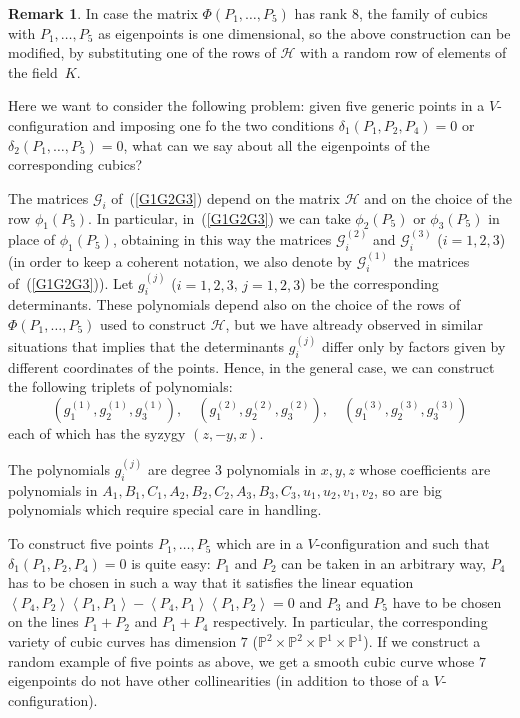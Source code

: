 \documentclass[11pt, a4paper, reqno, captions=tableheading,bibliography=totoc]{scrartcl}
\theoremstyle{plain}
\theoremstyle{definition}
\newtheorem{rmk}[lemma]{Remark}
\newcommand{\scl}[2]{\left\langle {#1}, {#2} \right\rangle}
\begin{document}
\begin{rmk}
In case the matrix $\Phi(P_1, \dots, P_5)$ has rank $8$, the family of
cubics with $P_1, \dots, P_5$ as eigenpoints is one dimensional, so the
above construction can be modified, by substituting one of the rows of
$\mathcal{H}$ with a random row of elements of the field~$K$.
\end{rmk}

Here we want to consider the following problem:
given five generic points in a $V$-configuration and imposing one
fo the two conditions
$\delta_1(P_1, P_2, P_4) = 0$ or $\delta_2(P_1, \dots, P_5) = 0$, what
can we say about all the eigenpoints of the corresponding cubics?

The matrices $\mathcal{G}_i$ of~(\ref{G1G2G3}) depend on the matrix
$\mathcal{H}$ and on the choice of the row $\phi_1(P_5)$. In particular,
in~(\ref{G1G2G3}) we can take $\phi_2(P_5)$ or $\phi_3(P_5)$ in place
of $\phi_1(P_5)$, obtaining in this way the matrices
$\mathcal{G}_i^{(2)}$ and $\mathcal{G}_i^{(3)}$ ($i=1, 2, 3$) (in order
to keep a coherent notation, we also denote by $\mathcal{G}_i^{(1)}$
the matrices of~(\ref{G1G2G3})). Let $g_i^{(j)}$ ($i=1, 2, 3$, $j = 1, 2, 3$)
be the corresponding determinants. These polynomials depend also on
the choice of the rows of $\Phi(P_1, \dots, P_5)$ used to construct
$\mathcal{H}$, but we have altready observed in similar situations that
 implies that the determinants $g_i^{(j)}$
differ only by factors given by different coordinates of the points.
Hence, in the general case, we can construct the following triplets of
polynomials:
\begin{equation}
\left(g_1^{(1)}, g_2^{(1)}, g_3^{(1)}\right),\quad
\left(g_1^{(2)}, g_2^{(2)}, g_3^{(2)}\right),\quad
\left(g_1^{(3)}, g_2^{(3)}, g_3^{(3)}\right)
\label{3tripletsPol}
\end{equation}
each of which has the syzygy $(z, -y, x)$.

The polynomials $g_i^{(j)}$ are degree $3$ polynomials in $x, y, z$ whose
coefficients are polynomials in $A_1, B_1, C_1, A_2, B_2, C_2, A_3, B_3, C_3,
u_1, u_2, v_1, v_2$, so are big polynomials which require
special care in handling.

To construct five points $P_1, \dots, P_5$ which are in a $V$-configuration
and such that $\delta_1(P_1, P_2, P_4)= 0$ is quite easy: $P_1$
and $P_2$ can be taken in an arbitrary way, $P_4$ has to be chosen in such
a way that it satisfies the linear
equation $\scl{P_4}{P_2}\scl{P_1}{P_1}-\scl{P_4}{P_1}\scl{P_1}{P_2} = 0$
and $P_3$ and $P_5$ have to be chosen on the lines $P_1+P_2$ and $P_1+P_4$
respectively. In particular, the corresponding variety of cubic curves
has dimension $7$ ($\mathbb{P}^2\times \mathbb{P}^2 \times
\mathbb{P}^1\times  \mathbb{P}^1$).
If we construct a random example
of five points as above, we get a smooth cubic curve whose $7$ eigenpoints
do not have other collinearities (in addition to those of a
$V$-configuration).
\end{document}
